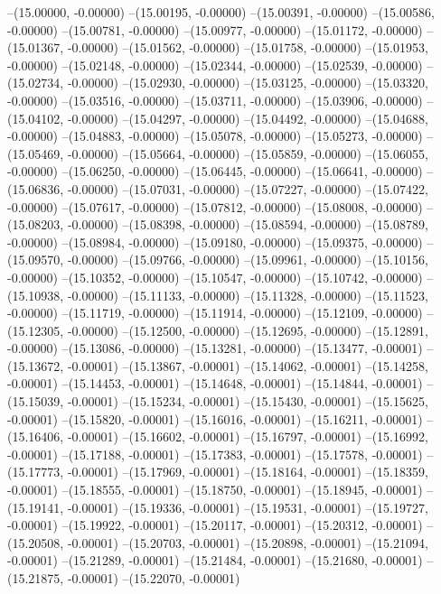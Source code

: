 --(15.00000, -0.00000)
--(15.00195, -0.00000)
--(15.00391, -0.00000)
--(15.00586, -0.00000)
--(15.00781, -0.00000)
--(15.00977, -0.00000)
--(15.01172, -0.00000)
--(15.01367, -0.00000)
--(15.01562, -0.00000)
--(15.01758, -0.00000)
--(15.01953, -0.00000)
--(15.02148, -0.00000)
--(15.02344, -0.00000)
--(15.02539, -0.00000)
--(15.02734, -0.00000)
--(15.02930, -0.00000)
--(15.03125, -0.00000)
--(15.03320, -0.00000)
--(15.03516, -0.00000)
--(15.03711, -0.00000)
--(15.03906, -0.00000)
--(15.04102, -0.00000)
--(15.04297, -0.00000)
--(15.04492, -0.00000)
--(15.04688, -0.00000)
--(15.04883, -0.00000)
--(15.05078, -0.00000)
--(15.05273, -0.00000)
--(15.05469, -0.00000)
--(15.05664, -0.00000)
--(15.05859, -0.00000)
--(15.06055, -0.00000)
--(15.06250, -0.00000)
--(15.06445, -0.00000)
--(15.06641, -0.00000)
--(15.06836, -0.00000)
--(15.07031, -0.00000)
--(15.07227, -0.00000)
--(15.07422, -0.00000)
--(15.07617, -0.00000)
--(15.07812, -0.00000)
--(15.08008, -0.00000)
--(15.08203, -0.00000)
--(15.08398, -0.00000)
--(15.08594, -0.00000)
--(15.08789, -0.00000)
--(15.08984, -0.00000)
--(15.09180, -0.00000)
--(15.09375, -0.00000)
--(15.09570, -0.00000)
--(15.09766, -0.00000)
--(15.09961, -0.00000)
--(15.10156, -0.00000)
--(15.10352, -0.00000)
--(15.10547, -0.00000)
--(15.10742, -0.00000)
--(15.10938, -0.00000)
--(15.11133, -0.00000)
--(15.11328, -0.00000)
--(15.11523, -0.00000)
--(15.11719, -0.00000)
--(15.11914, -0.00000)
--(15.12109, -0.00000)
--(15.12305, -0.00000)
--(15.12500, -0.00000)
--(15.12695, -0.00000)
--(15.12891, -0.00000)
--(15.13086, -0.00000)
--(15.13281, -0.00000)
--(15.13477, -0.00001)
--(15.13672, -0.00001)
--(15.13867, -0.00001)
--(15.14062, -0.00001)
--(15.14258, -0.00001)
--(15.14453, -0.00001)
--(15.14648, -0.00001)
--(15.14844, -0.00001)
--(15.15039, -0.00001)
--(15.15234, -0.00001)
--(15.15430, -0.00001)
--(15.15625, -0.00001)
--(15.15820, -0.00001)
--(15.16016, -0.00001)
--(15.16211, -0.00001)
--(15.16406, -0.00001)
--(15.16602, -0.00001)
--(15.16797, -0.00001)
--(15.16992, -0.00001)
--(15.17188, -0.00001)
--(15.17383, -0.00001)
--(15.17578, -0.00001)
--(15.17773, -0.00001)
--(15.17969, -0.00001)
--(15.18164, -0.00001)
--(15.18359, -0.00001)
--(15.18555, -0.00001)
--(15.18750, -0.00001)
--(15.18945, -0.00001)
--(15.19141, -0.00001)
--(15.19336, -0.00001)
--(15.19531, -0.00001)
--(15.19727, -0.00001)
--(15.19922, -0.00001)
--(15.20117, -0.00001)
--(15.20312, -0.00001)
--(15.20508, -0.00001)
--(15.20703, -0.00001)
--(15.20898, -0.00001)
--(15.21094, -0.00001)
--(15.21289, -0.00001)
--(15.21484, -0.00001)
--(15.21680, -0.00001)
--(15.21875, -0.00001)
--(15.22070, -0.00001)
